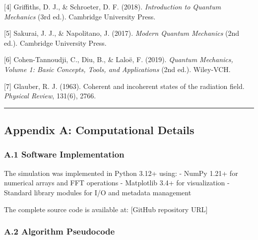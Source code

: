 \documentclass[
]{article}
\begin{document}
{[}4{]} Griffiths, D. J., \& Schroeter, D. F. (2018). \emph{Introduction
to Quantum Mechanics} (3rd ed.). Cambridge University Press.

{[}5{]} Sakurai, J. J., \& Napolitano, J. (2017). \emph{Modern Quantum
Mechanics} (2nd ed.). Cambridge University Press.

{[}6{]} Cohen-Tannoudji, C., Diu, B., \& Laloë, F. (2019). \emph{Quantum
Mechanics, Volume 1: Basic Concepts, Tools, and Applications} (2nd ed.).
Wiley-VCH.

{[}7{]} Glauber, R. J. (1963). Coherent and incoherent states of the
radiation field. \emph{Physical Review}, 131(6), 2766.

\begin{center}\rule{0.5\linewidth}{0.5pt}\end{center}

\subsection{Appendix A: Computational
Details}\label{appendix-a-computational-details}

\subsubsection{A.1 Software
Implementation}\label{a.1-software-implementation}

The simulation was implemented in Python 3.12+ using: - NumPy 1.21+ for
numerical arrays and FFT operations - Matplotlib 3.4+ for visualization
- Standard library modules for I/O and metadata management

The complete source code is available at: {[}GitHub repository URL{]}

\subsubsection{A.2 Algorithm Pseudocode}\label{a.2-algorithm-pseudocode}
\end{document}
